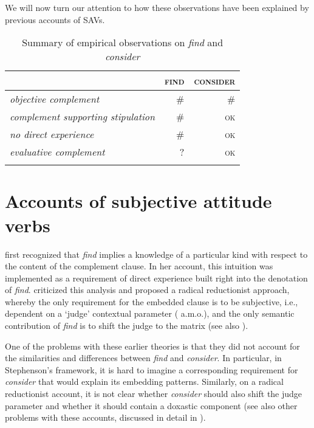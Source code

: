 \documentclass[output=paper,colorlinks,citecolor=brown]{langscibook}
\begin{document}
We will now turn our attention to how these observations have been explained by previous accounts of SAVs.

\begin{table}
\caption{Summary of empirical observations on \textit{find} and \textit{consider}}
\label{tab:summary:Fusco}
\begin{tabularx}{.8\textwidth}{X rr}
  \lsptoprule
     & \textsc{find} & \textsc{consider}\\
  \midrule
  \textit{objective complement} & \# &  \#\\
  \textit{complement supporting stipulation} & \# &   \textsc{ok}  \\
  \textit{no direct experience} & \# &  \textsc{ok}  \\
  \textit{evaluative complement} & ? &  \textsc{ok}  \\
  \lspbottomrule
 \end{tabularx}
 \end{table}

\section{Accounts of subjective attitude verbs}
\label{sec:accounts:Fusco}

\citet{stephenson_thesis_2007} first recognized that \textit{find} implies a knowledge of a particular kind with respect to the content of the complement clause. In her account, this intuition was implemented as a requirement of direct experience built right into the denotation of \textit{find}. \citet{saebo_2009} criticized this analysis and proposed a radical reductionist approach, whereby the only requirement for the embedded clause is to be subjective, i.e., dependent on a ‘judge’ contextual parameter (\cite{lasersohn_2005, stephenson_judge_2007, stojanovic_2007} a.m.o.), and the only semantic contribution of \textit{find} is to shift the judge to the matrix  (see also \cite{bouchard_thesis_2012}).

One of the problems with these earlier theories is that they did not account for the similarities and differences between \textit{find} and \textit{consider}. In particular, in Stephenson’s framework, it is hard to imagine a corresponding requirement for \textit{consider} that would explain its embedding patterns. Similarly, on a radical reductionist account, it is not clear whether \textit{consider} should also shift the judge parameter and whether it should contain a doxastic component (see also other problems with these accounts, discussed in detail in \citealt{anand2022theorize}).
\end{document}
